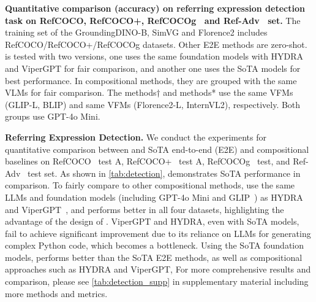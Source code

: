 \begin{table}[t]
\caption{\textbf{Quantitative comparison (accuracy) on referring expression detection task on RefCOCO, RefCOCO+, RefCOCOg~\cite{kazemzadeh_referitgame_2014} and Ref-Adv~\cite{akula_words_2020} set.} The training set of the GroundingDINO-B, SimVG and Florence2 includes RefCOCO/RefCOCO+/RefCOCOg datasets. 
Other E2E methods are zero-shot. \methodname{} is tested with two versions, one uses the same foundation models with HYDRA and ViperGPT for fair comparison, and another one uses the SoTA models for best performance. In compositional methods, they are grouped with the same VLMs for fair comparison. The methods† and methods* use the same VFMs (GLIP-L, BLIP) and same VFMs (Florence2-L, InternVL2), respectively. Both groups use GPT-4o Mini.}
\label{tab:detection}
\vspace{-4.5mm}
\end{table}

\noindent\textbf{Referring Expression Detection.} We conduct the experiments for quantitative comparison between \methodname{} and SoTA end-to-end (E2E) and compositional baselines on RefCOCO~\cite{kazemzadeh_referitgame_2014} test A, RefCOCO+~\cite{kazemzadeh_referitgame_2014} test A, RefCOCOg~\cite{kazemzadeh_referitgame_2014} test, and Ref-Adv~\cite{akula_words_2020} test set. As shown in \autoref{tab:detection}, \methodname{} demonstrates SoTA performance in comparison. To fairly compare to other compositional methods, \methodname{} use the same LLMs and foundation models (including GPT-4o Mini and GLIP~\cite{li_grounded_2022}) as HYDRA~\cite{ke_hydra_2024} and ViperGPT~\cite{ke_hydra_2024}, and performs better in all four datasets, highlighting the advantage of the design of \methodname{}. ViperGPT and HYDRA, even with SoTA models, fail to achieve significant improvement due to its reliance on LLMs for generating complex Python code, which becomes a bottleneck. Using the SoTA foundation models, \methodname{} performs better than the SoTA E2E methods, as well as compositional approaches such as HYDRA and ViperGPT,  %
For more comprehensive results and comparison, please see \autoref{tab:detection_supp} in supplementary material including more methods and metrics.

